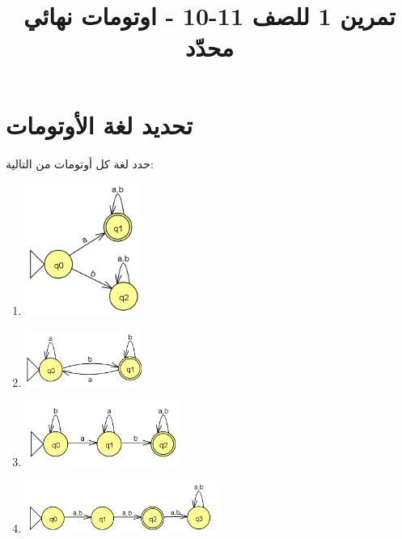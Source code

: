 \documentclass[12pt]{article}
\title{تمرين 1 للصف 11-10 - اوتومات نهائي محدّد}
\begin{document}
\maketitle

\section{تحديد لغة الأوتومات}

حدد لغة كل أوتومات من التالية:

\begin{enumerate}

\item
\includegraphics[width=0.3\textwidth]{../../../images/DFAs/ex1_q1.png}\\

\item
\includegraphics[width=0.3\textwidth]{../../../images/DFAs/ex1_q2.png}\\

\item
\includegraphics[width=0.4\textwidth]{../../../images/DFAs/ex1_q3.png}\\

\item
\includegraphics[width=0.5\textwidth]{../../../images/DFAs/ex1_q4.png}\\


\end{enumerate}
\end{document}
